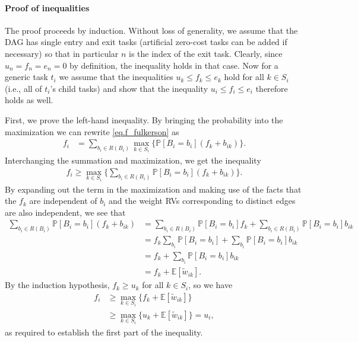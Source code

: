 \documentclass[12pt]{article}
\def\P{\mathbb{P}}
\def\E{\mathbb{E}}
\begin{document}
\paragraph{Proof of inequalities}
\label{para.fulkerson_proof}

The proof proceeds by induction. Without loss of generality, we assume that the DAG has single entry and exit tasks (artificial zero-cost tasks can be added if necessary) so that in particular $n$ is the index of the exit task. Clearly, since $u_n = f_n = e_n = 0$ by definition, the inequality holds in that case. Now for a generic task $t_i$ we assume that the inequalities $u_k \leq f_k \leq e_k$ hold for all $k \in S_i$ (i.e., all of $t_i$'s child tasks) and show that the inequality $u_i \leq f_i \leq e_i$ therefore holds as well. 

First, we prove the left-hand inequality. By bringing the probability into the maximization we can rewrite \eqref{eq.f_fulkerson} as    
\begin{align*}
f_i &= \sum_{b_i \in R(B_i)} \max_{k \in S_i} \{ \P[B_i = b_i] (f_k + b_{ik} ) \}.
\end{align*}
Interchanging the summation and maximization, we get the inequality
\begin{align*}
f_i \geq \max_{k \in S_i} \bigg\{ \sum_{b_i \in R(B_i)} \P[B_i = b_i] (f_k + b_{ik} ) \bigg\}.
\end{align*}
By expanding out the term in the maximization and making use of the facts that the $f_k$ are independent of $b_i$ and the weight RVs corresponding to distinct edges are also independent, we see that
\begin{align*}
\sum_{b_i \in R(B_i)} \P[B_i = b_i] (f_k + b_{ik} ) &=  \sum_{b_i \in R(B_i)} \P[B_i = b_i]f_k + \sum_{b_i \in R(B_i)} \P[B_i = b_i] b_{ik} \\
&= f_k \sum_{b_i} \P[B_i = b_i] + \sum_{b_i} \P[B_i = b_i] b_{ik} \\
&= f_k + \sum_{b_i} \P[B_i = b_i] b_{ik} \\
&= f_k + \E[\tilde{w}_{ik}].
\end{align*}
By the induction hypothesis, $f_k \geq u_k$ for all $k \in S_i$, so we have
\begin{align*}
f_i &\geq \max_{k \in S_i} \{ f_k + \E[\tilde{w}_{ik}] \} \\
&\geq \max_{k \in S_i} \{ u_k + \E[\tilde{w}_{ik}] \} = u_i,
\end{align*}
as required to establish the first part of the inequality. 
\end{document}
